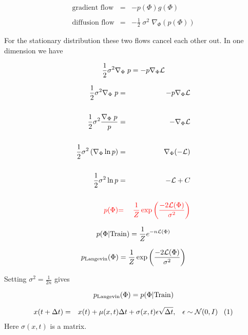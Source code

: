 {

\begin{eqnarray*}
\mbox{gradient flow} & = & - p(\Phi)g(\Phi) \\
\\
\mbox{diffusion flow} & = & - \frac{1}{2} \;\sigma^2\;\nabla_\Phi(p(\Phi))
\end{eqnarray*}

\vfill
For the stationary distribution these two flows cancel each other out.
In one dimension we have

$$\frac{1}{2} \sigma^2 \nabla_\Phi\; {p} = - p\nabla_\Phi {\cal L}$$


\vspace{-2ex}
\begin{eqnarray*}
\frac{1}{2} \sigma^2 \nabla_\Phi\; {p} & = & - p\nabla_\Phi {\cal L} \\
\\
\frac{1}{2} \sigma^2 \frac{\nabla_\Phi\;p}{p} & = & - \nabla_\Phi {\cal L} \\
\\
\frac{1}{2} \sigma^2 \left(\nabla_\Phi \ln p\right) & = &  \nabla_\Phi (- {\cal L}) \\
\\
\frac{1}{2} \sigma^2 \ln p & = & - {\cal L} + C \\
\\
{\color{red} p(\Phi)} & {\color{red} =} & {\color{red} \frac{1}{Z}\exp\left(\frac{-2{\cal L}(\Phi)}{\sigma^2}\right)}
\end{eqnarray*}



$$p(\Phi|\mathrm{Train}) = \frac{1}{Z}e^{-n{\cal L}(\Phi)}$$

\vfill
$$p_{\mathrm{Langevin}}(\Phi) = \frac{1}{Z}\exp\left(\frac{-2{\cal L}(\Phi)}{\sigma^2}\right)$$

\vfill
Setting $\sigma^2 = \frac{1}{2n}$ gives

\vfill
$$p_{\mathrm{Langevin}}(\Phi) = p(\Phi|\mathrm{Train})$$


{\huge
\begin{eqnarray*}
x(t + \Delta t) &  =  & x(t) + \mu(x,t)\Delta t + \sigma(x,t)\epsilon \sqrt{\Delta t},\;\;\;\epsilon \sim {\cal N}(0,I)\;\;\;(1)
 \end{eqnarray*}
}
\vfill
Here $\sigma(x,t)$ is a matrix.

}
